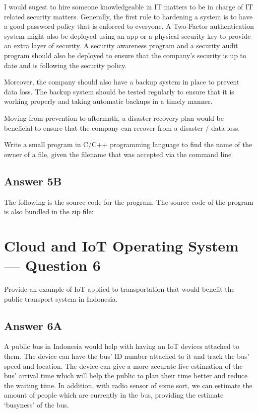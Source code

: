 \documentclass[
  11pt, %
]{assignment}
\begin{document}
I would sugest to hire someone knowledgeable in IT matters to be in charge of IT related security matters. Generally, the first rule to hardening a system is to have a good password policy that is enforced to everyone. A Two-Factor authentication system might also be deployed using an app or a physical security key to provide an extra layer of security. A security awareness program and a security audit program should also be deployed to ensure that the company's security is up to date and is following the security policy.

Moreover, the company should also have a backup system in place to prevent data loss. The backup system should be tested regularly to ensure that it is working properly and taking automatic backups in a timely manner.

Moving from prevention to aftermath, a disaster recovery plan would be beneficial to ensure that the company can recover from a disaster / data loss.


\begin{problem}
Write a small program in C/C++ programming language to find the name of the owner of a file, given the filename that was accepted via the command line
\end{problem}

\subsection*{Answer 5B}

The following is the source code for the program. The source code of the program is also bundled in the zip file:



\section*{Cloud and IoT Operating System --- Question 6}

\begin{problem}
Provide an example of IoT applied to transportation that would benefit the public transport system in Indonesia.
\end{problem}

\subsection*{Answer 6A}

A public bus in Indonesia would help with having an IoT devices attached to them. The device can have the bus' ID number attached to it and track the bus' speed and location. The device can give a more accurate live estimation of the bus' arrival time which will help the public to plan their time better and reduce the waiting time. In addition, with radio sensor of some sort, we can estimate the amount of people which are currently in the bus, providing the estimate `busyness' of the bus.
\end{document}
